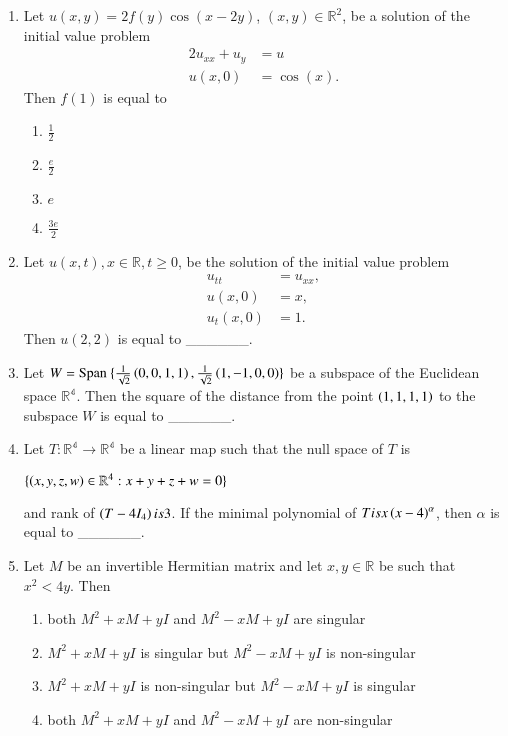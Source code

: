 \documentclass[journal,12pt,onecolumn]{IEEEtran}
\theoremstyle{remark}
\begin{document}
\begin{enumerate}
\item Let $u(x, y) = 2f(y) \cos(x - 2y)$, $(x, y) \in \mathbb{R}^2$, be a solution of the initial value problem
\begin{align*}
	2u_{xx} + u_y &= u \\
	u(x, 0) &= \cos(x).
\end{align*}
Then $f(1)$ is equal to
\begin{multicols}{4}
	\begin{enumerate}
		\item $\frac{1}{2}$
		\item $\frac{e}{2}$
		\item $e$
		\item $\frac{3e}{2}$
	\end{enumerate}
\end{multicols}
\item Let $u(x,t), x\in \mathbb{R}, t\geq0$, be the solution of the initial value problem
\begin{align*}
	u_{tt} &= u_{xx}, \\
	u(x,0) &= x, \\
	u_t(x,0) &= 1.
\end{align*}
Then $u(2,2)$ is equal to \_\_\_\_\_\_.\\

\item Let $W = \text{Span } \{\frac{1}{\sqrt{2}}\left(0,0,1,1\right), \frac{1}{\sqrt{2}}\left(1,-1,0,0\right) \}$ be a subspace of the Euclidean space $\mathbb{R^{4}}$. Then the square of the distance from the point $\left(1,1,1,1\right)$ to the subspace $W$ is equal to \_\_\_\_\_\_.\\

\item Let $T : \mathbb{R^{4}} \rightarrow \mathbb{R^{4}}$ be a linear map such that the null space of $T$ is
\begin{center}
	$\{ \left(x,y,z,w\right) \in \mathbb{R}^{4}:x+y+z+w=0 \}$
\end{center}
and rank of $\left(T - 4I_4\right) is 3$. If the minimal polynomial of $T is x\left(x-4\right)^{\alpha}$, then $\alpha$ is equal to \_\_\_\_\_\_.\\

\item Let $M$ be an invertible Hermitian matrix and let $x,y \in \mathbb{R}$ be such that $x^{2}<4y$. Then
\begin{enumerate}
	\item both $M^{2} + xM + yI$ and $M^{2} - xM + yI$ are singular
	\item $M^{2} + xM + yI$ is singular but $M^{2} - xM + yI$ is non-singular
	\item $M^{2} + xM + yI$ is non-singular but $M^{2} - xM + yI$ is singular
	\item both $M^{2} + xM + yI$ and $M^{2} - xM + yI$ are non-singular
\end{enumerate}


\end{enumerate}
\end{document}
